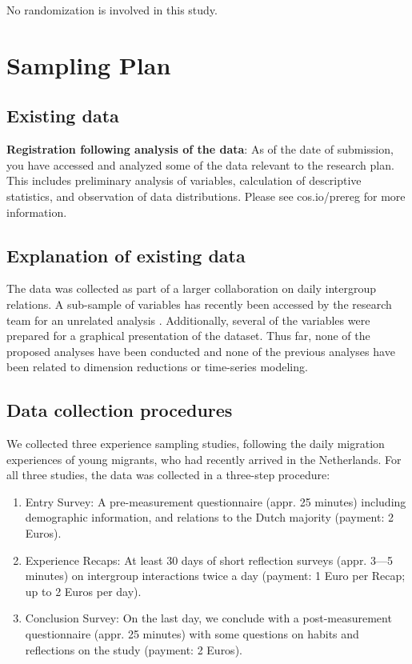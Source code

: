 \documentclass[]{article}
\providecommand{\tightlist}{%
\setlength{\itemsep}{0pt}\setlength{\parskip}{0pt}}
\newcounter{question}
\begin{document}
No randomization is involved in this study.

\hypertarget{sampling-plan}{%
\section{Sampling Plan}\label{sampling-plan}}

\hypertarget{existing-data}{%
\subsection{Existing data}\label{existing-data}}

\textbf{Registration following analysis of the data}: As of the date of
submission, you have accessed and analyzed some of the data relevant to
the research plan. This includes preliminary analysis of variables,
calculation of descriptive statistics, and observation of data
distributions. Please see cos.io/prereg for more information.

\hypertarget{explanation-of-existing-data}{%
\subsection{Explanation of existing
data}\label{explanation-of-existing-data}}

The data was collected as part of a larger collaboration on daily
intergroup relations. A sub-sample of variables has recently been
accessed by the research team for an unrelated analysis
\citep{Kreienkamp2022b}. Additionally, several of the variables were
prepared for a graphical presentation of the dataset. Thus far, none of
the proposed analyses have been conducted and none of the previous
analyses have been related to dimension reductions or time-series
modeling.

\hypertarget{data-collection-procedures}{%
\subsection{Data collection
procedures}\label{data-collection-procedures}}

We collected three experience sampling studies, following the daily
migration experiences of young migrants, who had recently arrived in the
Netherlands. For all three studies, the data was collected in a
three-step procedure:

\begin{enumerate}
\def\labelenumi{\arabic{enumi}.}
\tightlist
\item
  Entry Survey: A pre-measurement questionnaire (appr. 25 minutes)
  including demographic information, and relations to the Dutch majority
  (payment: 2 Euros).
\item
  Experience Recaps: At least 30 days of short reflection surveys (appr.
  3---5 minutes) on intergroup interactions twice a day (payment: 1 Euro
  per Recap; up to 2 Euros per day).
\item
  Conclusion Survey: On the last day, we conclude with a
  post-measurement questionnaire (appr. 25 minutes) with some questions
  on habits and reflections on the study (payment: 2 Euros).
\end{enumerate}
\end{document}
